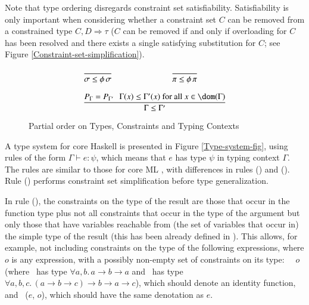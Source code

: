 \documentclass[review]{elsarticle}
\begin{document}
Note that type ordering disregards constraint set satisfiability.
Satisfiability is only important when considering whether a constraint
set $C$ can be removed from a constrained type $C,D \Rightarrow \tau$
($C$ can be removed if and only if overloading for $C$ has been
resolved and there exists a single satisfying substitution for $C$;
see Figure \ref{Constraint-set-simplification}).

\begin{figure}
   \[ \begin{array}{ccc}
   	\displaystyle\frac
          {}
          {\sigma \leq \phi\,\sigma}
   	  & \hspace{0.6cm} &
   	\displaystyle\frac
   	  {}
   	  {\pi \leq \phi\,\pi} \\ \\
        \multicolumn{3}{c}{
          \displaystyle\frac
	    {P_\Gamma = P_{\Gamma'} \:\:\:
	     \Gamma(x) \leq \Gamma'(x) \text{ for all } x\in \dom(\Gamma)}
	    {\Gamma \leq \Gamma'}
        }
  \end{array} \]
\caption{Partial order on Types, Constraints and Typing Contexts}
\label{Order}
\end{figure}

A type system for core Haskell is presented in Figure
\ref{Type-system-fig}, using rules of the form $\Gamma \vdash e:\psi$,
which means that $e$ has type $\psi$ in typing context $\Gamma$. The
rules are similar to those for core ML
\cite{Damas82,Kanellakis91,Mitchell-Harper93,Kfoury94}, with
differences in rules (\APP) and (\LET). Rule (\LET) performs
constraint set simplification before type generalization.

In rule (\APP), the constraints on the type of the result are those
that occur in the function type plus not all constraints that occur in
the type of the argument but only those that have variables reachable
from (the set of variables that occur in) the simple type of the
result (this has been already defined in
\cite{Ambiguity-and-context-dependent-overloading}).  This allows, for
example, not including constraints on the type of the following
expressions, where $o$ is any expression, with a possibly non-empty
set of constraints on its type: {\tt \flip\ \const\ $o$} (where
\const\ has type $\forall a, b.\,a \rightarrow b \rightarrow a$ and
\flip\ has type $\forall a, b, c.\,(a \rightarrow b \rightarrow c)
\rightarrow b \rightarrow a\rightarrow c$), which should denote an
identity function, and \fst\ ($e$, $o$), which should have the same
denotation as $e$.
\end{document}

